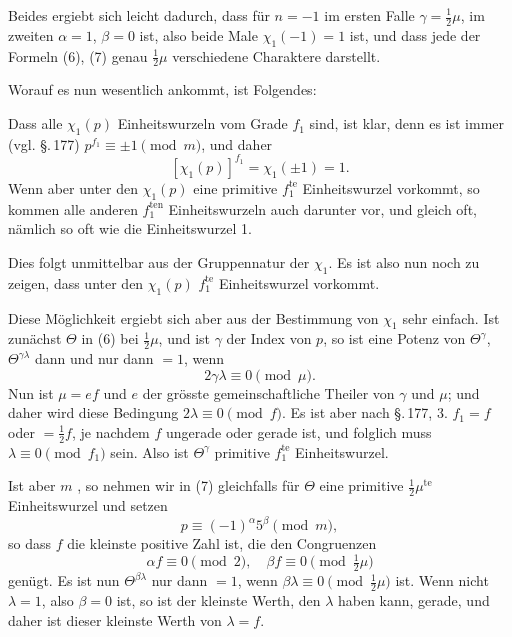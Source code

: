 Beides ergiebt sich leicht dadurch, dass für $n = -1$ im ersten
Falle $\gamma = \tfrac12\mu$, im zweiten $\alpha=1$, $\beta=0$ ist,
also beide Male $\chi_1(-1)=1$ ist, und dass jede der Formeln (6),
(7) genau $\tfrac12\mu$ verschiedene Charaktere darstellt.

Worauf es nun wesentlich ankommt, ist Folgendes:

\begin{quote}
\end{quote}

Dass alle $\chi_1(p)$ Einheitswurzeln vom Grade $f_1$ sind, ist
klar, denn es ist immer (vgl. \S.\,177) $p^{f_1}\equiv\pm1\pmod{m}$,
und daher
\[ [\chi_1(p)]^{f_1} = \chi_1(\pm1) = 1. \]
Wenn aber unter den $\chi_1(p)$ eine primitive $f_1^{\text{te}}$
Einheitswurzel vorkommt, so kommen alle anderen $f_1^{\text{ten}}$
Einheitswurzeln auch darunter vor, und gleich oft, nämlich so oft
wie die Einheitswurzel 1.

Dies folgt unmittelbar aus der Gruppennatur der $\chi_1$. Es ist
also nun noch zu zeigen, dass unter den $\chi_1(p)$ 
$f_1^{\text{te}}$ Einheitswurzel vorkommt.

Diese Möglichkeit ergiebt sich aber aus der Bestimmung von $\chi_1$
sehr einfach. Ist zunächst $\Theta$ in (6) bei  $\tfrac12\mu$, und ist $\gamma$
der Index von $p$, so ist eine Potenz von $\Theta^{\gamma}$,
$\Theta^{\gamma\lambda}$ dann und nur dann $=1$, wenn
\[ 2\gamma\lambda \equiv 0 \pmod{\mu}. \]
Nun ist $\mu=ef$ und $e$ der grösste gemeinschaftliche Theiler von
$\gamma$ und $\mu$; und daher wird diese Bedingung
$2\lambda\equiv0\pmod{f}$. Es ist aber nach \S.\,177, 3. $f_1=f$
oder $=\tfrac12 f$, je nachdem $f$ ungerade oder gerade ist, und
folglich muss $\lambda\equiv0\pmod{f_1}$ sein. Also ist
$\Theta^{\gamma}$ primitive $f_1^{\text{te}}$ Einheitswurzel.

Ist aber $m$ , so nehmen wir in (7) gleichfalls für $\Theta$
eine primitive $\tfrac12\mu^{\text{te}}$ Einheitswurzel und setzen
\[ p \equiv (-1)^{\alpha}5^{\beta} \pmod{m}, \]
so dass $f$ die kleinste positive Zahl ist, die den Congruenzen
\[ \alpha f \equiv 0 \pmod{2}, \quad \beta f \equiv 0 \pmod{\tfrac12\mu} \]
genügt. Es ist nun $\Theta^{\beta\lambda}$ nur dann $=1$, wenn
$\beta\lambda\equiv0\pmod{\tfrac12\mu}$ ist. Wenn nicht $\lambda=1$,
also $\beta=0$ ist, so ist der kleinste Werth, den $\lambda$ haben
kann, gerade, und daher ist dieser kleinste Werth von $\lambda=f$.
